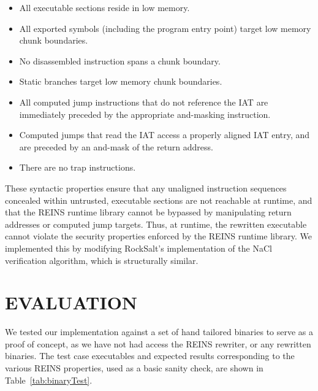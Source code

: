 \documentclass[conference]{IEEEtran}
\begin{document}
\begin{itemize}
\item All executable sections reside in low memory.
\item All exported symbols (including the program entry point) target low memory chunk boundaries.
\item No disassembled instruction spans a chunk boundary.
\item Static branches target low memory chunk boundaries.
\item All computed jump instructions that do not reference the IAT are immediately preceded by the appropriate and-masking instruction.
\item Computed jumps that read the IAT access a properly aligned IAT entry, and are preceded by an and-mask of the return address.
\item There are no trap instructions.
\end{itemize}

These syntactic properties ensure that any unaligned instruction sequences concealed within untrusted, executable sections are not reachable at runtime, and that the REINS runtime library cannot be bypassed by manipulating return addresses or computed jump targets. Thus, at runtime, the rewritten executable cannot violate the security properties enforced by the REINS runtime library. We implemented this by modifying RockSalt's implementation of the NaCl verification algorithm, which is structurally similar. 


\section{EVALUATION}

We tested our implementation against a set of hand tailored binaries to serve as a proof of concept, as we have not had access the REINS rewriter, or any rewritten binaries. The test case executables and expected results corresponding to the various REINS properties, used as a basic sanity check, are shown in Table~\ref{tab:binaryTest}.
 
\end{document}
